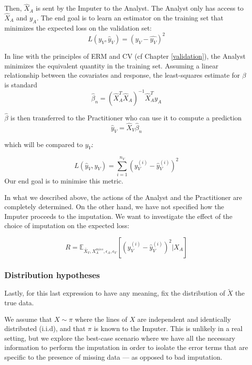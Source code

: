 Then, $\hat{X}_A$ is sent by the Imputer to the Analyst. The Analyst only has access to $\hat{X}_A$ and $y_A$. 
The end goal is to learn an estimator on the training set that minimizes the expected loss on the validation set:
$$
L(y_V, \hat{y}_V) = (y_V - \hat{y_V})^2
$$

In line with the principles of ERM and CV (cf Chapter \ref{validation}), the Analyst minimizes the equivalent quantity in the training set. Assuming a linear relationship between the covariates and response, the least-squares estimate for $\beta$ is standard \cite{seber2012linear}
$$
\hat{\beta}_n = (\hat{X}_A^T \hat{X}_A)^{-1} \hat{X}_A^T y_A 
$$

$\hat{\beta}$ is then transferred to the Practitioner who can use it to compute a prediction
$$\hat{y}_V = \hat{X}_V \hat{\beta}_n $$

which will be compared to $y_V$:

$$L(\hat{y}_V, y_V) = \sum\limits_{i=1}^{n_V} (y_V^{(i)} - \hat{y}_V^{(i)})^2$$
Our end goal is to minimise this metric. 

In what we described above, the actions of the Analyst and the Practitioner are completely determined. On the other hand, we have not specified how the Imputer proceeds to the imputation. We want to investigate the effect of the choice of imputation on the expected loss:

$$R = \mathbb{E}_{\tilde{X_V}, X_A^{miss}, \epsilon_A, \epsilon_V}[(y_V^{(i)} - \hat{y}_V^{(i)})^2 \vert X_A]$$ %

			\subsubsection{Distribution hypotheses}
Lastly, for this last expression to have any meaning, fix the distribution of $\tilde{X}$ the true data.

We assume that $X \sim \pi$ where the lines of $X$ are independent and identically distributed (i.i.d), and that $\pi$ is known to the Imputer. This is unlikely in a real setting, but we explore the best-case scenario where we have all the necessary information to perform the imputation in order to isolate the error terms that are specific to the presence of missing data --- as opposed to bad imputation.


